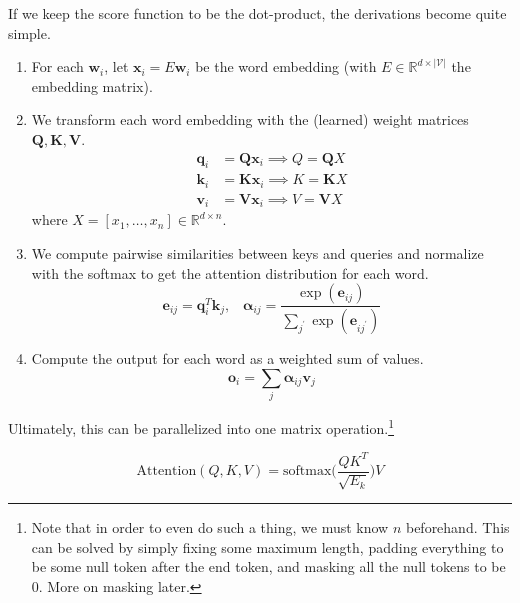     \begin{definition}
      If we keep the score function to be the dot-product, the derivations become quite simple. 
      \begin{enumerate}
        \item For each $\mathbf{w}_i$, let $\mathbf{x}_i = E \mathbf{w}_i$ be the word embedding (with $E \in \mathbb{R}^{d \times |\mathcal{V}|}$ the embedding matrix). 

        \item We transform each word embedding with the (learned) weight matrices $\mathbf{Q}, \mathbf{K}, \mathbf{V}$. 
        \begin{align*} 
          \mathbf{q}_i & = \mathbf{Q} \mathbf{x}_i \implies Q = \mathbf{Q} X \\
          \mathbf{k}_i & = \mathbf{K} \mathbf{x}_i \implies K = \mathbf{K} X \\
          \mathbf{v}_i & = \mathbf{V} \mathbf{x}_i \implies V = \mathbf{V} X 
        \end{align*}
        where $X = [x_1, \ldots, x_n] \in \mathbb{R}^{d \times n}$.  

        \item We compute pairwise similarities between keys and queries and normalize with the softmax to get the attention distribution for each word. 
          \begin{equation}
            \mathbf{e}_{ij} = \mathbf{q}_i^T \mathbf{k}_j , \;\;\; \boldsymbol{\alpha}_{ij} = \frac{\exp(\mathbf{e}_{ij})}{\sum_{j^\prime} \exp(\mathbf{e}_{i j^\prime})}
          \end{equation}

        \item Compute the output for each word as a weighted sum of values. 
          \begin{equation}
            \mathbf{o}_i = \sum_j \boldsymbol{\alpha}_{ij} \mathbf{v}_j 
          \end{equation}
      \end{enumerate}

      Ultimately, this can be parallelized into one matrix operation.\footnote{Note that in order to even do such a thing, we must know $n$ beforehand. This can be solved by simply fixing some maximum length, padding everything to be some null token after the end token, and masking all the null tokens to be $0$. More on masking later. } 

      \begin{equation} 
        \mathrm{Attention}(Q, K, V) = \mathrm{softmax} \bigg( \frac{Q K^T}{\sqrt{E_k}} \bigg) V
      \end{equation}


\end{definition}
